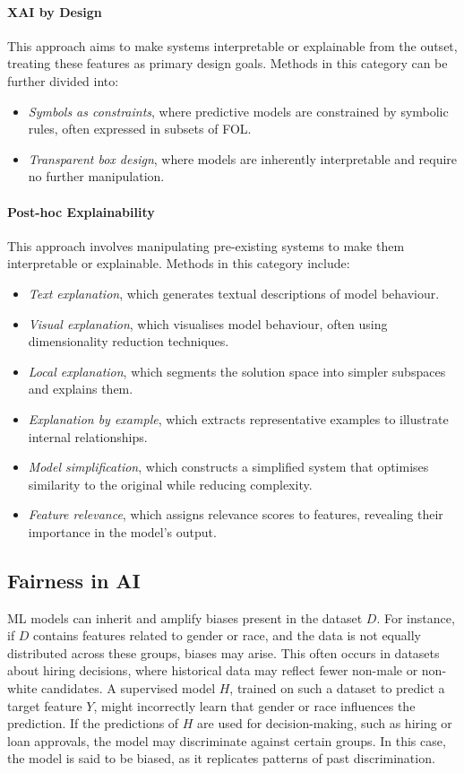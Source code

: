 \paragraph{\Gls{XAI} by Design}
\label{par:xai-by-design}
%
This approach aims to make systems interpretable or explainable from the outset, treating these features as primary design goals.
%
Methods in this category can be further divided into:
%
\begin{itemize}
    \item \emph{Symbols as constraints}, where predictive models are constrained by symbolic rules, often expressed in subsets of \gls{FOL}.
    \item \emph{Transparent box design}, where models are inherently interpretable and require no further manipulation.
\end{itemize}

\paragraph{Post-hoc Explainability}
%
This approach involves manipulating pre-existing systems to make them interpretable or explainable.
%
Methods in this category include:
%
\begin{itemize}
    \item \emph{Text explanation}, which generates textual descriptions of model behaviour.
    \item \emph{Visual explanation}, which visualises model behaviour, often using dimensionality reduction techniques.
    \item \emph{Local explanation}, which segments the solution space into simpler subspaces and explains them.
    \item \emph{Explanation by example}, which extracts representative examples to illustrate internal relationships.
    \item \emph{Model simplification}, which constructs a simplified system that optimises similarity to the original while reducing complexity.
    \item \emph{Feature relevance}, which assigns relevance scores to features, revealing their importance in the model's output.
\end{itemize}


\subsection[Fairness in AI]{Fairness in \gls{AI}}
\label{subsec:fairness-in-ai}
%
\Gls{ML} models can inherit and amplify biases present in the dataset \(D\).
%
For instance, if \(D\) contains features related to gender or race, and the data is not equally distributed across these groups, biases may arise.
%
This often occurs in datasets about hiring decisions, where historical data may reflect fewer non-male or non-white candidates.
%
A supervised model \(H\), trained on such a dataset to predict a target feature \(Y\), might incorrectly learn that gender or race influences the prediction.
%
If the predictions of \(H\) are used for decision-making, such as hiring or loan approvals, the model may discriminate against certain groups.
%
In this case, the model is said to be biased, as it replicates patterns of past discrimination.

